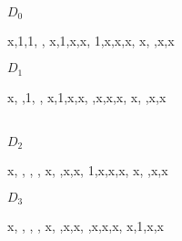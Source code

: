 \documentclass[11pt,a4paper,english]{article}
\begin{document}
    \begin{centering}
        $D_{0}$
        \begin{Karnaugh}
            \contingut
            {
                x,1,1, ,
                x,1,x,x,
                1,x,x,x,
                x, ,x,x
            }
        \end{Karnaugh}
        $D_1$
        \begin{Karnaugh}
            \contingut
            {
                x, ,1, ,
                x,1,x,x,
                 ,x,x,x,
                x, ,x,x
            }
        \end{Karnaugh}
        \\
       $D_2$
        \begin{Karnaugh}
            \contingut
            {
                x, , , ,
                x, ,x,x,
                1,x,x,x,
                x, ,x,x
            }
        \end{Karnaugh}
        $D_3$
        \begin{Karnaugh}
            \contingut
            {
                x, , , ,
                x, ,x,x,
                 ,x,x,x,
                x,1,x,x
            }
        \end{Karnaugh}     
    
    \end{centering}
 
\pagebreak

\pagebreak
\end{document}
